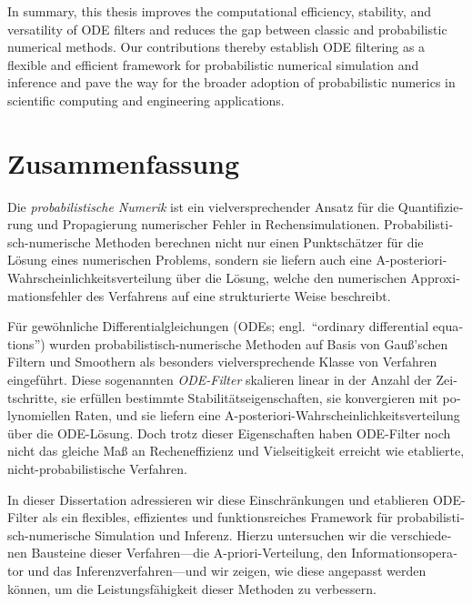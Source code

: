 \documentclass{mimosis}
\begin{document}
In summary, this thesis improves the computational efficiency, stability, and versatility of ODE filters and reduces the gap between classic and probabilistic numerical methods.
Our contributions thereby establish ODE filtering as a flexible and efficient framework for probabilistic numerical simulation and inference and pave the way for the broader adoption of probabilistic numerics in scientific computing and engineering applications.


\clearpage
\chapter{Zusammenfassung}
\label{sec:org9f7e2a4}

\begin{otherlanguage}{italian}

Die \emph{probabilistische Numerik} ist ein vielversprechender Ansatz für die Quantifizierung und Propagierung numerischer Fehler in Rechensimulationen.
Probabilistisch-numerische Methoden berechnen nicht nur einen Punktschätzer für die Lösung eines numerischen Problems, sondern sie liefern auch eine A-posteriori-Wahrscheinlichkeitsverteilung über die Lösung, welche den numerischen Approximationsfehler des Verfahrens auf eine strukturierte Weise beschreibt.

Für gewöhnliche Differentialgleichungen (ODEs;
engl.\ ``ordinary differential equations'')
wurden probabilistisch-numerische Methoden auf Basis von
Gau{\ss}'schen
Filtern und Smoothern als besonders vielversprechende Klasse von Verfahren eingeführt. Diese sogenannten \emph{ODE-Filter} skalieren linear in der Anzahl der Zeitschritte, sie erfüllen bestimmte Stabilitätseigenschaften, sie konvergieren mit polynomiellen Raten, und sie liefern eine A-posteriori-Wahrscheinlichkeitsverteilung über die ODE-Lösung. Doch trotz dieser Eigenschaften haben ODE-Filter noch nicht das gleiche
Ma{\ss}
an Recheneffizienz und Vielseitigkeit erreicht wie etablierte, nicht-probabilistische Verfahren.

In dieser Dissertation adressieren wir diese Einschränkungen und etablieren ODE-Filter als ein flexibles, effizientes und funktionsreiches Framework für probabilistisch-numerische Simulation und Inferenz. Hierzu untersuchen wir die verschiedenen Bausteine dieser Verfahren---die A-priori-Verteilung, den Informationsoperator und das Inferenzverfahren---und wir zeigen, wie diese angepasst werden können, um die Leistungsfähigkeit dieser Methoden zu verbessern.


\end{otherlanguage}
\end{document}
